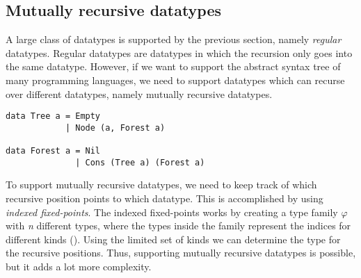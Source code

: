 \subsection{Mutually recursive datatypes}
A large class of datatypes is supported by the previous section, namely \textit{regular} datatypes. Regular datatypes are datatypes in which the recursion only goes into the same datatype. However, if we want to support the abstract syntax tree of many programming languages, we need to support datatypes which can recurse over different datatypes, namely mutually recursive datatypes.

\begin{verbatim}
data Tree a = Empty 
            | Node (a, Forest a)

data Forest a = Nil
              | Cons (Tree a) (Forest a)
\end{verbatim}

To support mutually recursive datatypes, we need to keep track of which recursive position points to which datatype. This is accomplished by using \textit{indexed fixed-points}\cite{yakushev2009generic}. The indexed fixed-points works by creating a type family $\varphi$ with \textit{n} different types, where the types inside the family represent the indices for different kinds (\inlinehaskell{*!$_{\varphi}$!}). Using the limited set of kinds we can determine the type for the recursive positions. Thus, supporting mutually recursive datatypes is possible, but it adds a lot more complexity.   